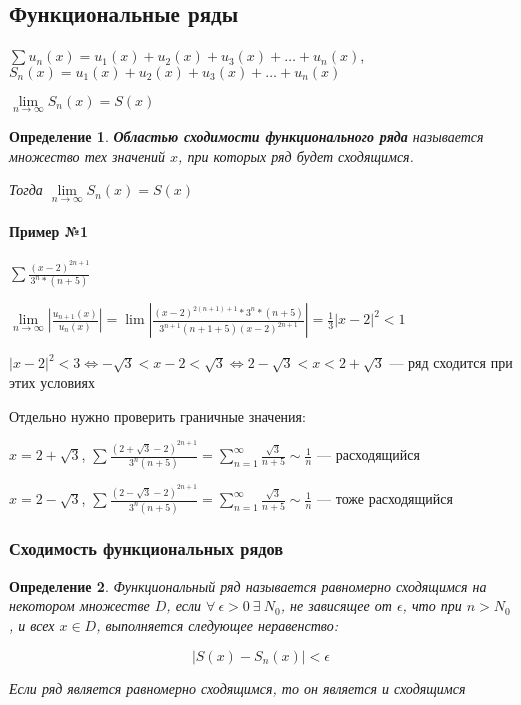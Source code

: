 \documentclass{article}
\newtheorem{definition}{Определение}
\begin{document}
\subsection{Функциональные ряды}

$\sum u_{n}(x) = u_1(x) + u_2(x) +u_3(x) + \dots + u_n(x)$, $S_{n}(x) = u_1(x) + u_2(x) +u_3(x) + \dots + u_n(x)$

$\lim\limits_{n \to \infty} S_{n} (x) = S(x)$

\begin{definition}
    \textbf{Областью сходимости функционального ряда} называется множество тех значений $x$, при которых ряд будет сходящимся.

    Тогда $\lim\limits_{n \to \infty} S_{n} (x) = S(x)$
\end{definition}

\paragraph{Пример №1}

$\sum \frac{(x - 2)^{2 n + 1}}{3^{n} * (n + 5)}$

$\lim\limits_{n \to \infty} | \frac{u_{ n + 1 } (x)}{u_{n} (x)} | = \lim | \frac{(x - 2)^{2 (n + 1) + 1} * 3^{n} * ( n + 5)}{3^{n + 1} (n + 1 + 5) (x - 2)^{2 n + 1}} | = \frac{1}{3} | x - 2 |^{2} < 1$

$|x - 2|^2 < 3 \Longleftrightarrow - \sqrt{3} < x - 2 < \sqrt{3} \Longleftrightarrow 2 - \sqrt{3} < x < 2 + \sqrt{3}$ — ряд сходится при этих условиях

Отдельно нужно проверить граничные значения:

$x = 2 + \sqrt{3}$, $\sum \frac{(2 + \sqrt{3} - 2)^{2 n + 1}}{3^{n} (n + 5)} = \sum\limits_{n = 1}^{\infty} \frac{\sqrt{3}}{n + 5} \sim \frac{1}{n}$ — расходящийся

$x = 2 - \sqrt{3}$,  $\sum \frac{(2 - \sqrt{3} - 2)^{2 n + 1}}{3^{n} (n + 5)} = \sum\limits_{n = 1}^{\infty} \frac{\sqrt{3}}{n + 5} \sim \frac{1}{n}$ — тоже расходящийся

\subsubsection{Сходимость функциональных рядов}

\begin{definition}
    Функциональный ряд называется равномерно сходящимся на некотором множестве $D$, если $\forall \ \epsilon > 0 \ \exists \ N_0$, не зависящее от $\epsilon$, что при $n > N_0$, и всех $x \in D$, выполняется следующее неравенство:

    $$| S(x) - S_{n} (x) | < \epsilon$$

    Если ряд является равномерно сходящимся, то он является и сходящимся
\end{definition}
\end{document}
